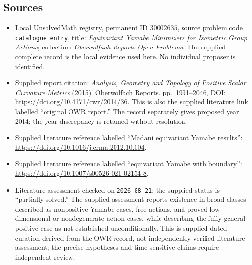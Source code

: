 \documentclass[11pt]{article}
\begin{document}
\subsection{Sources}
\begin{itemize}
\item Local UnsolvedMath registry, permanent ID \(30002635\), source problem code \texttt{catalogue entry}, title: \emph{Equivariant Yamabe Minimizers for Isometric Group Actions}; collection: \emph{Oberwolfach Reports Open Problems}. The supplied complete record is the local evidence used here. No individual proposer is identified.
\item Supplied report citation: \emph{Analysis, Geometry and Topology of Positive Scalar Curvature Metrics} (2015), Oberwolfach Reports, pp.\ 1991--2046, DOI: \url{https://doi.org/10.4171/owr/2014/36}. This is also the supplied literature link labelled ``original OWR report.'' The record separately gives proposed year 2014; the year discrepancy is retained without resolution.
\item Supplied literature reference labelled ``Madani equivariant Yamabe results'': \url{https://doi.org/10.1016/j.crma.2012.10.004}.
\item Supplied literature reference labelled ``equivariant Yamabe with boundary'': \url{https://doi.org/10.1007/s00526-021-02154-8}.
\item Literature assessment checked on \texttt{2026-08-21}: the supplied status is ``partially solved.'' The supplied assessment reports existence in broad classes described as nonpositive Yamabe cases, free actions, and proved low-dimensional or nondegenerate-action cases, while describing the fully general positive case as not established unconditionally. This is supplied dated curation derived from the OWR record, not independently verified literature assessment; the precise hypotheses and time-sensitive claims require independent review.
\end{itemize}
\end{document}
